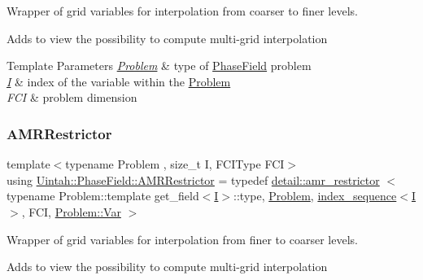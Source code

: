 Wrapper of grid variables for interpolation from coarser to finer levels. 

Adds to view the possibility to compute multi-\/grid interpolation


\begin{DoxyTemplParams}{Template Parameters}
{\em \hyperlink{classUintah_1_1PhaseField_1_1Problem}{Problem}} & type of \hyperlink{namespaceUintah_1_1PhaseField}{Phase\+Field} problem \\
\hline
{\em \hyperlink{structUintah_1_1PhaseField_1_1I}{I}} & index of the variable within the \hyperlink{classUintah_1_1PhaseField_1_1Problem}{Problem} \\
\hline
{\em F\+CI} & problem dimension \\
\hline
\end{DoxyTemplParams}
\mbox{\label{namespaceUintah_1_1PhaseField_a75763c981a43e822af372ed79bbc54b6}} 
\subsubsection{\texorpdfstring{A\+M\+R\+Restrictor}{AMRRestrictor}}
{\footnotesize\ttfamily template$<$typename Problem , size\+\_\+t I, F\+C\+I\+Type F\+CI$>$ \\
using \hyperlink{namespaceUintah_1_1PhaseField_a75763c981a43e822af372ed79bbc54b6}{Uintah\+::\+Phase\+Field\+::\+A\+M\+R\+Restrictor} = typedef \hyperlink{classUintah_1_1PhaseField_1_1detail_1_1amr__restrictor}{detail\+::amr\+\_\+restrictor} $<$ typename Problem\+::template get\+\_\+field$<$\hyperlink{structUintah_1_1PhaseField_1_1I}{I}$>$\+::type, \hyperlink{classUintah_1_1PhaseField_1_1Problem}{Problem}, \hyperlink{namespaceUintah_1_1PhaseField_a237de804d99512e50613aff7c94a9461}{index\+\_\+sequence}$<$\hyperlink{structUintah_1_1PhaseField_1_1I}{I}$>$, F\+CI, \hyperlink{classUintah_1_1PhaseField_1_1Problem_a74de1351a682f8523456962f0fc49a18}{Problem\+::\+Var} $>$}



Wrapper of grid variables for interpolation from finer to coarser levels. 

Adds to view the possibility to compute multi-\/grid interpolation


